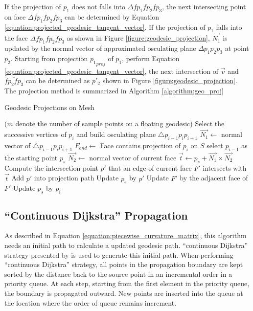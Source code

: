 If the projection of $p_{1}$ does not falls into $\Delta fp_{1}fp_{2}fp_{3}$, the next intersecting point on face $\Delta fp_{1}fp_{2}fp_{3}$ can be determined by Equation \ref{equation:projected_geodesic_tangent_vector}. If the projection of $p_{1}$ falls into the face $\Delta fp_{1}fp_{2}fp_{3}$ as shown in Figure \ref{figure:geodesic_projection}, $\vec{N_{1}}$ is updated by the normal vector of approximated osculating plane $\Delta p_{1}p_{2}p_{3}$ at point $p_{2}$. Starting from projection ${p_{1}}_{proj}$ of $p_{1}$, perform Equation \ref{equation:projected_geodesic_tangent_vector}, the next intersection of $\vec{v}$ and $\overline{fp_{2}fp_{3}}$ can be determined as $p'_{2}$ shown in Figure \ref{figure:geodesic_projection}. The projection method is summarized in Algorithm \ref{algorithm:geo_proj}

\begin{algorithm}
\caption{Geodesic Projections on Mesh}\label{algorithm:geo_proj}
\begin{algorithmic}[1]
	 ($m$ denote the number of sample points on a floating geodesic)
		\State Select the successive vertices of $p_{i}$ and build osculating plane $\triangle{p_{i-1}p_{i}p_{i+1}}$
		\State $\vec{N_{1}} \gets$ normal vector of $\triangle{p_{i-1}p_{i}p_{i+1}}$
		\State $F_{end} \gets$ Face contains projection of $p_{i}$ on $S$
		\State select $p_{i-1}$ as the starting point $p_s$
				\State $\vec{N_{2}} \gets$ normal vector of current face	
				\State $\vec{t} \gets p_{s} + \vec{N_{1}} \times \vec{N_{2}}$ 	
				\State Compute the intersection point $p'$ that an edge of current face $F'$ intersects with  $\vec{t}$
					\State Add $p'$ into projection path
					\State Update $p_{s}$ by $p'$
					\State Update $F'$ by the adjacent face of $F'$
				\EndIf
			\EndFor
		\EndWhile
		\State Update $p_{s}$ by $p_{i}$	
	\EndFor
\EndProcedure
\end{algorithmic}
\end{algorithm}
\subsection{``Continuous Dijkstra'' Propagation}

As described in Equation \ref{equation:piecewise_curvature_matrix}, this algorithm needs an initial path to calculate a updated geodesic path. ``continuous Dijkstra'' strategy presented by  is used to generate this initial path. When performing ``continuous Dijkstra'' strategy, all points in the propagation boundary are kept sorted by the distance back to the source point in an incremental order in a priority queue. At each step, starting from the first element in the priority queue, the boundary is propagated outward.  New points are inserted into the queue at the location where the order of queue remains increment.

